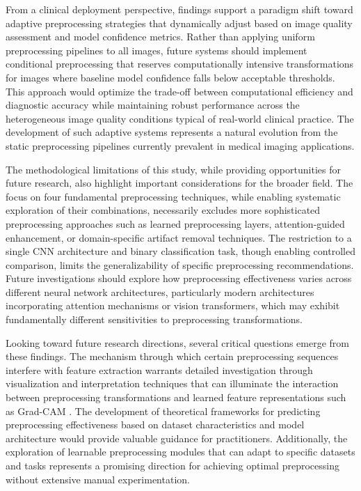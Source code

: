\documentclass[journal]{IEEEtran}
\begin{document}
From a clinical deployment perspective, findings support a paradigm shift toward adaptive preprocessing strategies that dynamically adjust based on image quality assessment and model confidence metrics. Rather than applying uniform preprocessing pipelines to all images, future systems should implement conditional preprocessing that reserves computationally intensive transformations for images where baseline model confidence falls below acceptable thresholds. This approach would optimize the trade-off between computational efficiency and diagnostic accuracy while maintaining robust performance across the heterogeneous image quality conditions typical of real-world clinical practice. The development of such adaptive systems represents a natural evolution from the static preprocessing pipelines currently prevalent in medical imaging applications.

The methodological limitations of this study, while providing opportunities for future research, also highlight important considerations for the broader field. The focus on four fundamental preprocessing techniques, while enabling systematic exploration of their combinations, necessarily excludes more sophisticated preprocessing approaches such as learned preprocessing layers, attention-guided enhancement, or domain-specific artifact removal techniques. The restriction to a single CNN architecture and binary classification task, though enabling controlled comparison, limits the generalizability of specific preprocessing recommendations. Future investigations should explore how preprocessing effectiveness varies across different neural network architectures, particularly modern architectures incorporating attention mechanisms or vision transformers, which may exhibit fundamentally different sensitivities to preprocessing transformations.

Looking toward future research directions, several critical questions emerge from these findings. The mechanism through which certain preprocessing sequences interfere with feature extraction warrants detailed investigation through visualization and interpretation techniques that can illuminate the interaction between preprocessing transformations and learned feature representations such as Grad-CAM \cite{8237336}. The development of theoretical frameworks for predicting preprocessing effectiveness based on dataset characteristics and model architecture would provide valuable guidance for practitioners. Additionally, the exploration of learnable preprocessing modules that can adapt to specific datasets and tasks represents a promising direction for achieving optimal preprocessing without extensive manual experimentation.
\end{document}
